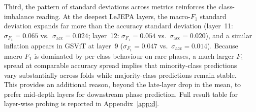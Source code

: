 \documentclass[11pt, a4paper]{article}
\begin{document}
Third, the pattern of standard deviations across metrics reinforces the
class-imbalance reading. At the deepest LeJEPA layers, the macro-$F_1$
standard deviation expands far more than the accuracy standard deviation
(layer~11: $\sigma_{F_1} = 0.065$ vs.\ $\sigma_{\text{acc}} = 0.024$;
layer~12: $\sigma_{F_1} = 0.054$ vs.\ $\sigma_{\text{acc}} = 0.020$), and
a similar inflation appears in GSViT at layer~9 ($\sigma_{F_1} = 0.047$
vs.\ $\sigma_{\text{acc}} = 0.014$). Because macro-$F_1$ is dominated by
per-class behaviour on rare phases, a much larger $F_1$ spread at
comparable accuracy spread implies that minority-class predictions vary
substantially across folds while majority-class predictions remain
stable. This provides an additional reason, beyond the late-layer drop
in the mean, to prefer mid-depth layers for downstream phase
prediction. Full result table for layer-wise probing is reported in Appendix~\ref{app:d}.
\end{document}
